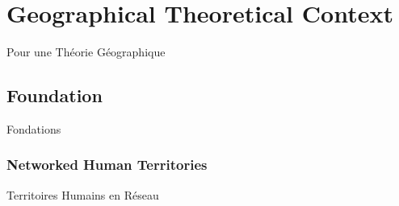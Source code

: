 
\newpage



\section{Geographical Theoretical Context}{Pour une Théorie Géographique}



\subsection{Foundation}{Fondations}



\subsubsection{Networked Human Territories}{Territoires Humains en Réseau}


